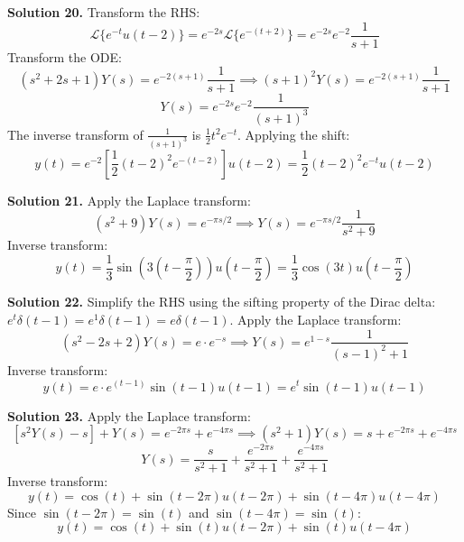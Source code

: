 \documentclass[11pt, letterpaper]{article}
\theoremstyle{definition}
\theoremstyle{remark}
\begin{document}
\vspace{1em}
\textbf{Solution 20.}
Transform the RHS:
\[ \mathcal{L}\{e^{-t}u(t - 2)\} = e^{-2s}\mathcal{L}\{e^{-(t + 2)}\} = e^{-2s}e^{-2}\frac{1}{s + 1} \]
Transform the ODE:
\[ (s^2 + 2s + 1)Y(s) = e^{-2(s + 1)}\frac{1}{s + 1} \implies (s + 1)^2 Y(s) = e^{-2(s + 1)}\frac{1}{s + 1} \]
\[ Y(s) = e^{-2s}e^{-2}\frac{1}{(s + 1)^3} \]
The inverse transform of $\frac{1}{(s + 1)^3}$ is $\frac{1}{2}t^2 e^{-t}$.
Applying the shift:
\[ y(t) = e^{-2} \left[ \frac{1}{2}(t - 2)^2 e^{-(t - 2)} \right] u(t - 2) = \frac{1}{2}(t - 2)^2 e^{-t} u(t - 2) \]

\vspace{1em}
\textbf{Solution 21.}
Apply the Laplace transform:
\[ (s^2 + 9)Y(s) = e^{-\pi s / 2} \implies Y(s) = e^{-\pi s / 2}\frac{1}{s^2 + 9} \]
Inverse transform:
\[ y(t) = \frac{1}{3}\sin\left(3\left(t - \frac{\pi}{2}\right)\right)u\left(t - \frac{\pi}{2}\right) = \frac{1}{3}\cos(3t)u\left(t - \frac{\pi}{2}\right) \]

\begin{center}
\end{center}

\vspace{1em}
\textbf{Solution 22.}
Simplify the RHS using the sifting property of the Dirac delta: $e^t \delta(t - 1) = e^1 \delta(t - 1) = e\delta(t - 1)$.
Apply the Laplace transform:
\[ (s^2 - 2s + 2)Y(s) = e \cdot e^{-s} \implies Y(s) = e^{1 - s}\frac{1}{(s - 1)^2 + 1} \]
Inverse transform:
\[ y(t) = e \cdot e^{(t - 1)}\sin(t - 1)u(t - 1) = e^t \sin(t - 1)u(t - 1) \]

\vspace{1em}
\textbf{Solution 23.}
Apply the Laplace transform:
\[ [s^2 Y(s) - s] + Y(s) = e^{-2\pi s} + e^{-4\pi s} \implies (s^2 + 1)Y(s) = s + e^{-2\pi s} + e^{-4\pi s} \]
\[ Y(s) = \frac{s}{s^2 + 1} + \frac{e^{-2\pi s}}{s^2 + 1} + \frac{e^{-4\pi s}}{s^2 + 1} \]
Inverse transform:
\[ y(t) = \cos(t) + \sin(t - 2\pi)u(t - 2\pi) + \sin(t - 4\pi)u(t - 4\pi) \]
Since $\sin(t - 2\pi) = \sin(t)$ and $\sin(t - 4\pi) = \sin(t)$:
\[ y(t) = \cos(t) + \sin(t)u(t - 2\pi) + \sin(t)u(t - 4\pi) \]
\end{document}
